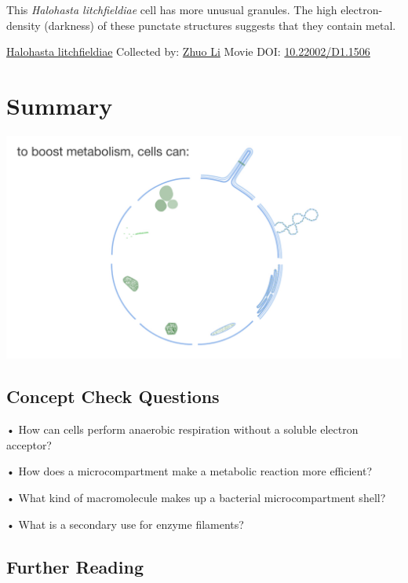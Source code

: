 \documentclass[]{tufte-book}
\begin{document}
This \emph{Halohasta litchfieldiae} cell has more unusual granules. The high electron-density (darkness) of these punctate structures suggests that they contain metal.



\hypertarget{htmlwidget-aa97a12aca14bbc8f6fe}{}

\label{fig:4-10b}\protect\hyperlink{tree}{Halohasta litchfieldiae} Collected by: \protect\hyperlink{zhuo_li}{Zhuo Li} Movie DOI: \href{https://doi.org/10.22002/D1.1506}{10.22002/D1.1506}

\hypertarget{summary-2}{%
\section{Summary}\label{summary-2}}

\includegraphics{img/summaries/04_Growth}

\hypertarget{concept-check-questions-2}{%
\subsection*{Concept Check Questions}\label{concept-check-questions-2}}

• How can cells perform anaerobic respiration without a soluble electron acceptor?

• How does a microcompartment make a metabolic reaction more efficient?

• What kind of macromolecule makes up a bacterial microcompartment shell?

• What is a secondary use for enzyme filaments?

\hypertarget{further-reading-3}{%
\subsection*{Further Reading}\label{further-reading-3}}
\end{document}
